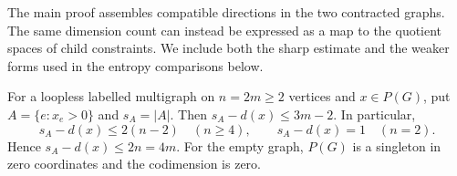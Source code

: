 The main proof assembles compatible directions in the two contracted
graphs. The same dimension count can instead be expressed as a map to
the quotient spaces of child constraints. We include both the sharp
estimate and the weaker forms used in the entropy comparisons below.

\begin{proposition}
\label{a:prop-supported-codimension}
For a loopless labelled multigraph on \(n=2m\ge2\) vertices and
\(x\in P(G)\), put \(A=\{e:x_e>0\}\) and \(s_A=|A|\).
Then \(s_A-d(x)\le3m-2\). In particular,
\begin{equation}
\label{a:eq-full-support-codimension}
 s_A-d(x)\le 2(n-2)\quad(n\ge4),
 \qquad s_A-d(x)=1\quad(n=2).
\end{equation}
Hence \(s_A-d(x)\le2n=4m\). For the empty graph,
\(P(G)\) is a singleton in zero coordinates and the codimension is zero.
\end{proposition}

